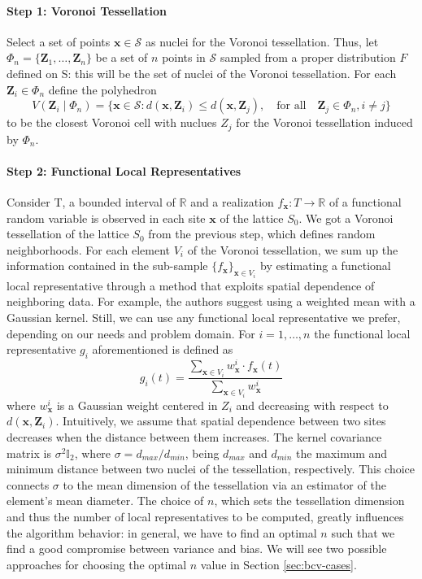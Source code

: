 \paragraph{Step 1: Voronoi Tessellation} Select a set of points $\mathbf{x}\in\mathcal{S}$ as nuclei for the Voronoi tessellation. Thus, let $\Phi_n=\{\mathbf{Z}_1, \dots, \mathbf{Z}_n\}$ be a set of $n$ points in $\mathcal{S}$ sampled from a proper distribution $F$ defined on S: this will be the set of nuclei of the Voronoi tessellation. For each $\mathbf{Z}_i\in\Phi_n$ define the polyhedron
\begin{equation}
    \label{eq:polyedron}
    V\left(\mathbf{Z}_i \mid \Phi_n\right)=\{\mathbf{x}\in\mathcal{S} : d\left(\mathbf{x},\mathbf{Z}_i\right) \leq d\left(\mathbf{x}, \mathbf{Z}_j\right), \quad \text{for all}\quad \mathbf{Z}_j \in \Phi_n, i\neq j\}
\end{equation}
to be the closest Voronoi cell with nuclues $Z_j$ for the Voronoi tessellation induced by $\Phi_n$.
\paragraph{Step 2: Functional Local Representatives} Consider T, a bounded interval of $\mathbb{R}$ and a realization $f_{\mathbf{x}}:T\rightarrow \mathbb{R}$ of a functional random variable is observed in each site $\mathbf{x}$ of the lattice $S_0$. We got a Voronoi tessellation of the lattice $S_0$ from the previous step, which defines random neighborhoods. For each element $V_i$ of the Voronoi tessellation, we sum up the information contained in the sub-sample $\{f_{\mathbf{x}}\}_{\mathbf{x} \in V_i}$ by estimating a functional local representative through a method that exploits spatial dependence of neighboring data. For example, the authors suggest using a weighted mean with a Gaussian kernel. Still, we can use any functional local representative we prefer, depending on our needs and problem domain. For $i=1, \dots, n$ the functional local representative $g_i$ aforementioned is defined as
\begin{equation}
    \label{eq:gaussianmean}
    g_i(t)=\frac{\sum_{\mathbf{x}\in V_i}w^i_{\mathbf{x}}\cdot f_{\mathbf{x}}(t)}{\sum_{\mathbf{x}\in V_i}w^i_{\mathbf{x}}}
\end{equation}
where $w_{\mathbf{x}}^i$ is a Gaussian weight centered in $Z_i$ and decreasing with respect to $d\left(\mathbf{x}, \mathbf{Z}_i\right)$. Intuitively, we assume that spatial dependence between two sites decreases when the distance between them increases. The kernel covariance matrix is $\sigma^2\mathbb{I}_2$, where $\sigma=d_{max}/d_{min}$, being $d_{max}$ and $d_{min}$ the maximum and minimum distance between two nuclei of the tessellation, respectively. This choice connects $\sigma$ to the mean dimension of the tessellation via an estimator of the element's mean diameter. The choice of $n$, which sets the tessellation dimension and thus the number of local representatives to be computed, greatly influences the algorithm behavior: in general, we have to find an optimal $n$ such that we find a good compromise between variance and bias. We will see two possible approaches for choosing the optimal $n$ value in Section \ref{sec:bcv-cases}.
